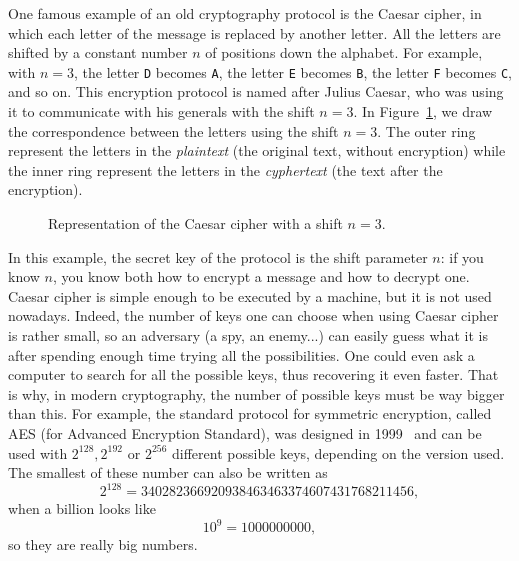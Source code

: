 One famous example of an old cryptography protocol is the Caesar cipher, in
which each letter of the message is replaced by another letter. All the letters
are shifted by a constant number $n$ of positions down the alphabet. For
example, with $n=3$, the letter \texttt{D} becomes \texttt{A}, the letter
\texttt{E} becomes \texttt{B}, the letter \texttt{F} becomes \texttt{C}, and so
on. This encryption protocol is named after Julius Caesar,
who was using it to communicate with his generals with the shift $n=3$. In
Figure~\ref{fig:caesar}, we draw the correspondence between the letters using
the shift $n=3$. The outer ring represent the letters in the \emph{plaintext}
(the original text, without encryption) while the inner ring represent the
letters in the \emph{cyphertext} (the text after the encryption).
\begin{figure}[h]
  \centering
  \caption{Representation of the Caesar cipher with a shift $n=3$.}
  \label{fig:caesar}
\end{figure}
In this example, the secret key of the protocol is the shift parameter $n$: if
you know $n$, you know both how to encrypt a message and how to decrypt one.
Caesar cipher is simple enough to be executed by a machine, but it is not used
nowadays. Indeed, the number of keys one can choose when using Caesar cipher is
rather small, so an adversary (a spy, an enemy...) can easily guess what it is
after spending enough time trying all the possibilities. One could even ask a
computer to search for all the possible keys, thus recovering it even faster.
That is why, in modern cryptography, the number of possible keys must be way
bigger than this. For example, the standard protocol for symmetric encryption,
called AES (for Advanced Encryption Standard), was designed in 1999~\cite{DR99,
DR02} and can be used with $2^{128}, 2^{192}$ or $2^{256}$ different possible
keys, depending on the version used. The smallest of these number can also be
written as
\[
  2^{128} = 340282366920938463463374607431768211456,
\]
when a billion looks like
\[
  10^{9} = 1000000000,
\]
so they are really big numbers.

